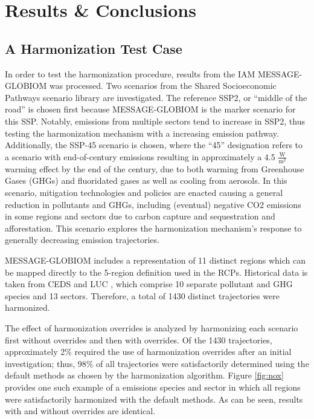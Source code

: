 \section{Results \& Conclusions}

\subsection{A Harmonization Test Case}

In order to test the  harmonization procedure, results from the IAM
MESSAGE-GLOBIOM  was processed. Two scenarios from the Shared Socioeconomic
Pathways scenario library  are investigated. The reference SSP2, or
``middle of the road'' is chosen first because MESSAGE-GLOBIOM is the marker
scenario for this SSP. Notably, emissions from multiple sectors tend to increase
in SSP2, thus testing the harmonization mechanism with a increasing emission
pathway. Additionally, the SSP-45 scenario is chosen, where the ``45''
designation refers to a scenario with end-of-century emissions resulting in
approximately a 4.5 $\frac{\text{W}}{\text{m}^2}$ warming effect by the end of
the century, due to both warming from Greenhouse Gases (GHGs) and fluoridated
gases as well as cooling from aerosols. In this scenario, mitigation
technologies and policies are enacted causing a general reduction in pollutants
and GHGs, including (eventual) negative CO2 emissions in some regions and
sectors due to carbon capture and sequestration and afforestation. This scenario
explores the harmonization mechanism's response to generally decreasing emission
trajectories.

MESSAGE-GLOBIOM includes a representation of 11 distinct regions which can be
mapped directly to the 5-region definition used in the RCPs. Historical data is
taken from CEDS and LUC , which comprise 10 separate
pollutant and GHG species and 13 sectors. Therefore, a total of 1430 distinct
trajectories were harmonized.

The effect of harmonization overrides is analyzed by harmonizing each scenario
first without overrides and then with overrides. Of the 1430 trajectories,
approximately 2\% required the use of harmonization overrides after an initial
investigation; thus, 98\% of all trajectories were satisfactorily determined
using the default methods as chosen by the harmonization algorithm. Figure
\ref{fig:nox} provides one such example of a emissions species and sector in
which all regions were satisfactorily harmonized with the default methods. As
can be seen, results with and without overrides are identical.

